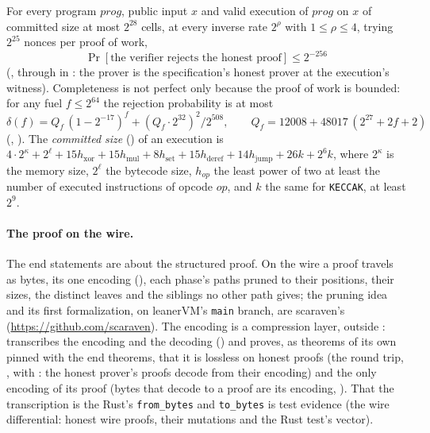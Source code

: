 \documentclass[11pt]{article}
\begin{document}
For every program $\mathit{prog}$, public input $x$ and valid execution of $\mathit{prog}$ on $x$ of committed size at
most $2^{28}$ cells, at every inverse rate $2^\rho$ with $1 \le \rho \le 4$, trying $2^{25}$ nonces
per proof of work,
\[
\boxed{\ \Pr[\text{the verifier rejects the honest proof}] \le 2^{-256}\ }
\]
(, through  in : the prover is the
specification's honest prover at the execution's witness). Completeness is not perfect only
because the proof of work is bounded: for any fuel $f \le 2^{64}$ the rejection probability is at
most
\[
\delta(f) = Q_f\,(1-2^{-17})^{f} + (Q_f\cdot 2^{32})^2/2^{508}, \qquad
Q_f = 12008 + 48017\,(2^{27} + 2f + 2)
\]
(, ). The \emph{committed size} () of an
execution is
$4\cdot 2^{\kappa} + 2^{\ell} + 15h_{\mathrm{xor}} + 15h_{\mathrm{mul}} + 8h_{\mathrm{set}} +
15h_{\mathrm{deref}} + 14h_{\mathrm{jump}} + 26k + 2^6 k$, where $2^\kappa$ is the memory size,
$2^\ell$ the bytecode size, $h_{op}$ the least power of two at least the number of executed
instructions of opcode $op$, and $k$ the same for \texttt{KECCAK}, at least $2^9$.

\paragraph{The proof on the wire.} The end statements are about the structured proof. On the wire
a proof travels as bytes, its one encoding (), each phase's
paths pruned to their positions, their sizes, the distinct leaves and the siblings no other path
gives; the pruning idea and its first formalization, on leanerVM's \texttt{main} branch, are
scaraven's (\url{https://github.com/scaraven}). The encoding is a compression layer, outside
:  transcribes the encoding and the decoding
() and proves, as theorems of its own pinned with the end
theorems, that it is lossless on honest proofs (the round trip, , with
: the honest prover's proofs decode from their
encoding) and the only encoding of its proof (bytes that decode to a proof are its encoding,
). That the transcription is the Rust's
\texttt{from\_bytes} and \texttt{to\_bytes} is test evidence (the wire differential: honest wire
proofs, their mutations and the Rust test's vector).
\end{document}
